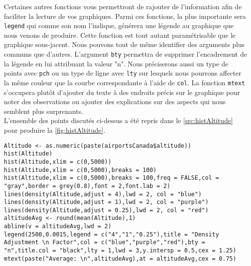 Certaines autres fonctions vous permettront de rajouter de l'information afin de faciliter la lecture de vos graphiques. Parmi ces fonctions, la plus importante sera \texttt{legend} qui comme son nom l'indique, générera une légende au graphique que nous venons de produire. Cette fonction est tout autant paramétrisable que le graphique sous-jacent. Nous pouvons tout de même identifier des arguments plus communs que d'autres. L'argument \texttt{bty} permettra de supprimer l'encadrement de la légende en lui attribuant la valeur "n". Nous préciserons aussi un type de points avec \texttt{pch} ou un type de ligne avec \texttt{lty} sur lesquels nous pourrons affecter la même couleur que la courbe correspondante à l'aide de \texttt{col}. La fonction \texttt{mtext} s'occupera plutôt d'ajouter du texte à des endroits précis sur le graphique pour noter des observations ou ajouter des explications sur des aspects qui nous semblent plus surprenants. \\

L'ensemble des points discutés ci-dessus a été repris dans le \autoref{src:histAltitude} pour produire la \autoref{fig:histAltitude}. \\

\begin{lstlisting}[caption = {\texttt{hist}, \texttt{density}, \texttt{lines}, \texttt{abline}, \texttt{legend} et \texttt{mtext}},label=src:histAltitude]
Altitude <- as.numeric(paste(airportsCanada$altitude))
hist(Altitude)
hist(Altitude,xlim = c(0,5000))
hist(Altitude,xlim = c(0,5000),breaks = 100)
hist(Altitude,xlim = c(0,5000),breaks = 100,freq = FALSE,col = "gray",border = grey(0.8),font = 2,font.lab = 2)
lines(density(Altitude,adjust = 4),lwd = 2, col = "blue")
lines(density(Altitude,adjust = 1),lwd = 2, col = "purple")
lines(density(Altitude,adjust = 0.25),lwd = 2, col = "red")
altitudeAvg <- round(mean(Altitude),1)
abline(v = altitudeAvg,lwd = 2)
legend(2500,0.0015,legend = c("4","1","0.25"),title = "Density Adjustment \n Factor",col = c("blue","purple","red"),bty = "n",title.col = "black",lty = 1,lwd = 3,y.intersp = 0.5,cex = 1.25)
mtext(paste("Average: \n",altitudeAvg),at = altitudeAvg,cex = 0.75)
\end{lstlisting}


